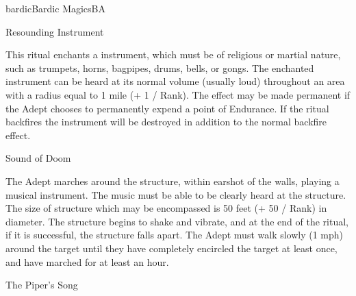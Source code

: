 \begin{college}[2.1]{bardic}{Bardic Magics}{BA}
\begin{ritual}[R-2]{Resounding Instrument}

\begin{effects}
This ritual enchants a instrument, which must be of religious or
martial nature, such as trumpets, horns, bagpipes, drums, bells, or
gongs.  The enchanted instrument can be heard at its normal volume
(usually loud) throughout an area with a radius equal to 1 mile (+ 1 /
Rank). The effect may be made permanent if the Adept chooses to
permanently expend a point of Endurance. If the ritual backfires the
instrument will be destroyed in addition to the normal backfire
effect.
\end{effects}
\end{ritual}

\begin{ritual}[R-3]{Sound of Doom}

\begin{effects}
The Adept marches around the structure, within earshot of the walls,
playing a musical instrument. The music must be able to be clearly
heard at the structure. The size of structure which may be encompassed
is 50 feet (+ 50 / Rank) in diameter. The structure begins to shake
and vibrate, and at the end of the ritual, if it is successful, the
structure falls apart.  The Adept must walk slowly (1 mph) around the
target until they have completely encircled the target at least once,
and have marched for at least an hour.
\end{effects}
\end{ritual}

\begin{ritual}[R-4]{The Piper's Song}


\end{ritual}
\end{college}
